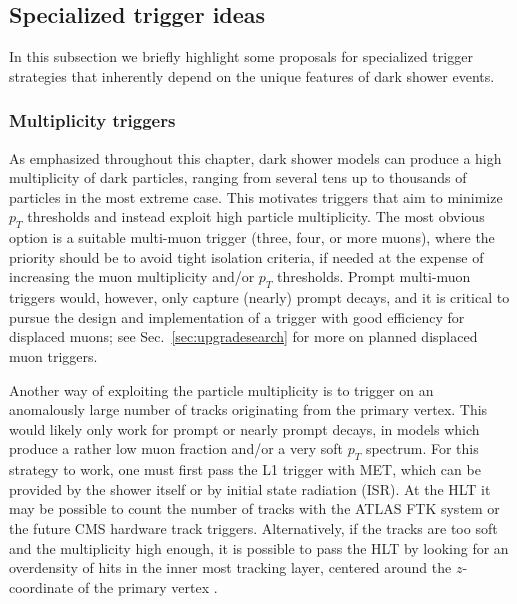 \subsection{Specialized trigger ideas}

In this subsection we briefly highlight some proposals for specialized trigger strategies that inherently depend on the unique features of dark shower events.


\subsubsection{Multiplicity triggers}
\label{sec:darkshowertrigmultiplicity}

As emphasized  throughout this chapter, dark shower models can produce a high multiplicity of dark particles, ranging from several tens up to thousands of particles in the most extreme case. This motivates triggers that aim to minimize $p_T$ thresholds and instead exploit high particle multiplicity. The most obvious option is a suitable multi-muon trigger (three, four, or more muons), where the priority should be to avoid tight isolation criteria, if needed at the expense of increasing the muon multiplicity and/or $p_T$ thresholds. Prompt multi-muon triggers would, however, only capture (nearly) prompt decays, and it is critical to pursue the design and implementation of a trigger with good efficiency for displaced muons; see Sec.~\ref{sec:upgradesearch} for more on planned displaced muon triggers. 

Another way of exploiting the particle multiplicity is to trigger on an anomalously large number of tracks originating from the primary vertex. This would likely only work for prompt or nearly prompt decays, in models which produce a rather low muon fraction and/or a very soft $p_T$ spectrum. For this strategy to work, one must first pass the L1 trigger with MET, which can be provided by the shower itself or by initial state radiation (ISR). At the HLT it may be possible to count the number of tracks with the ATLAS FTK system or the future CMS hardware track triggers. Alternatively, if the tracks are too soft and the multiplicity high enough, it is possible to pass the HLT  by looking for an overdensity of hits in the inner most tracking layer, centered around the $z$-coordinate of the primary vertex \cite{Knapen:2016hky}.

